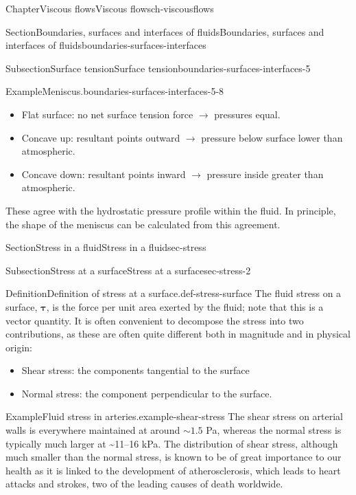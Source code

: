 \documentclass[oneside,10pt,]{book}
\numberwithin{equation}{section}
\newcommand{\btau}{\boldsymbol{\tau}}
\begin{document}
\begin{chapterptx}{Chapter}{Viscous flows}{}{Viscous flows}{}{}{ch-viscousflows}
\begin{sectionptx}{Section}{Boundaries, surfaces and interfaces of fluids}{}{Boundaries, surfaces and interfaces of fluids}{}{}{boundaries-surfaces-interfaces}
\begin{subsectionptx}{Subsection}{Surface tension}{}{Surface tension}{}{}{boundaries-surfaces-interfaces-5}
\begin{example}{Example}{Meniscus.}{boundaries-surfaces-interfaces-5-8}
%
\begin{itemize}[label=\textbullet]
\item{}Flat surface: no net surface tension force \(\rightarrow\) pressures equal.%
\item{}Concave up: resultant points outward \(\rightarrow\) pressure below surface lower than atmospheric.%
\item{}Concave down: resultant points inward \(\rightarrow\) pressure inside greater than atmospheric.%
\end{itemize}
%
\par
These agree with the hydrostatic pressure profile within the fluid. In principle, the shape of the meniscus can be calculated from this agreement.%
\end{example}
\end{subsectionptx}
\end{sectionptx}
%
%
\typeout{************************************************}
\typeout{************************************************}
%
\begin{sectionptx}{Section}{Stress in a fluid}{}{Stress in a fluid}{}{}{sec-stress}
%
%
\typeout{************************************************}
\typeout{************************************************}
%
\begin{subsectionptx}{Subsection}{Stress at a surface}{}{Stress at a surface}{}{}{sec-stress-2}
\begin{definition}{Definition}{Definition of stress at a surface.}{def-stress-surface}%
The fluid stress on a surface, \(\btau\), is the force per unit area exerted by the fluid; note that this is a vector quantity. It is often convenient to decompose the stress into two contributions, as these are often quite different both in magnitude and in physical origin:%
\begin{itemize}[label=\textbullet]
\item{}Shear stress: the components tangential to the surface%
\item{}Normal stress: the component perpendicular to the surface.%
\end{itemize}
%
\end{definition}
\begin{example}{Example}{Fluid stress in arteries.}{example-shear-stress}%
The shear stress on arterial walls is everywhere maintained at around \(\sim1.5\) Pa, whereas the normal stress is typically much larger at \textasciitilde{}11–16 kPa. The distribution of shear stress, although much smaller than the normal stress, is known to be of great importance to our health as it is linked to the development of atherosclerosis, which leads to heart attacks and strokes, two of the leading causes of death worldwide.%

\end{example}
\end{subsectionptx}
\end{sectionptx}
\end{chapterptx}
\end{document}
